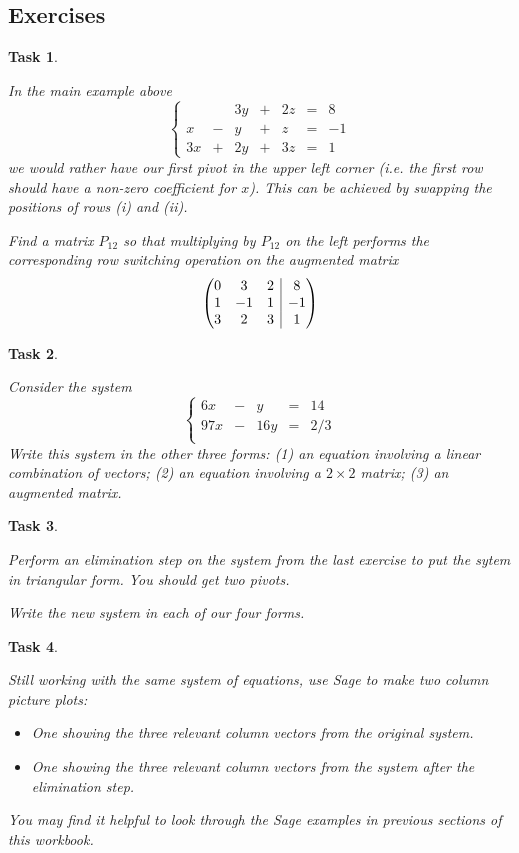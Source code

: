 \documentclass[10pt,]{book}
\makeatletter
\theoremstyle{plain}
\numberwithin{equation}{section}
\newtheorem{task}{Task}[chapter]
\newcommand{\augmatrix}[2]{\left(\begin{array}{@{}#1 |c@{}} #2 \end{array}\right)}
\makeatother
\begin{document}
\subsection[Exercises]{Exercises}\label{subsection-33}
\begin{task}
\label{task-47}

      In the main example above
      \[
      \left\{ \begin{array}{rrrrrrr}
         &  &3y &+ &2z &= &8 \\
       x &- & y &+ & z &= &-1 \\
      3x &+ &2y &+ &3z &= &1
      \end{array}
      \right.
      \]
      we would rather have our first pivot in the upper left corner (i.e. the
      first row should have a non-zero coefficient for \(x\)). This can be
      achieved by swapping the positions of rows (i) and (ii).
\par

      Find a matrix \(P_{12}\) so that multiplying by \(P_{12}\) on the left
      performs the corresponding row switching operation on the augmented matrix
      \[
      \augmatrix{ccc}{
      0 &3 &2 &8 \\ 1 &-1 &1 &-1 \\ 3 &2 &3 &1}
      \]
\end{task}
\begin{task}
\label{task-48}

      Consider the system
      \[
      \left\{ \begin{array}{rrrrr}
      6x &- &y &= &14 \\
      97x &- &16y &= &2/3 \\
      \end{array}
      \right.
      \]
      Write this system in the other three forms: (1) an equation involving a
      linear combination of vectors; (2) an equation involving a \(2\times 2\)
      matrix; (3) an augmented matrix.
\end{task}
\begin{task}
\label{task-49}

      Perform an elimination step on the system from the last exercise to put the sytem in triangular form. You should get two pivots.
\par

      Write the new system in each of our four forms.
\end{task}
\begin{task}
\label{task-50}

      Still working with the same system of equations, use Sage to make two column picture plots:
\begin{itemize}
\item{} One showing the three relevant column vectors from the original system.\item{} One showing the three relevant column vectors from the system after the elimination step.\end{itemize}
\par

      You may find it helpful to look through the Sage examples in previous sections
      of this workbook.
\end{task}
\end{document}
